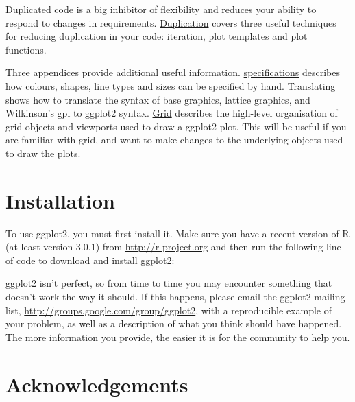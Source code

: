 Duplicated code is a big inhibitor of flexibility and reduces your
ability to respond to changes in requirements.
\hyperref[cha:duplication]{Duplication} covers three useful techniques
for reducing duplication in your code: iteration, plot templates and
plot functions.

Three appendices provide additional useful information.
\hyperref[cha:specifications]{specifications} describes how colours,
shapes, line types and sizes can be specified by hand.
\hyperref[cha:translating]{Translating} shows how to translate the
syntax of base graphics, lattice graphics, and Wilkinson's gpl to
ggplot2 syntax. \hyperref[cha:grid]{Grid} describes the high-level
organisation of grid objects and viewports used to draw a ggplot2 plot.
This will be useful if you are familiar with grid, and want to make
changes to the underlying objects used to draw the plots.

\section{Installation}\label{sec:installation}

To use ggplot2, you must first install it. Make sure you have a recent
version of R (at least version 3.0.1) from \url{http://r-project.org}
and then run the following line of code to download and install ggplot2:

\begin{Shaded}
\begin{Highlighting}[]
\NormalTok{(}\NormalTok{)}
\end{Highlighting}
\end{Shaded}

ggplot2 isn't perfect, so from time to time you may encounter something
that doesn't work the way it should. If this happens, please email the
ggplot2 mailing list, \url{http://groups.google.com/group/ggplot2}, with
a reproducible example of your problem, as well as a description of what
you think should have happened. The more information you provide, the
easier it is for the community to help you.

\section{Acknowledgements}\label{sec:acknolwedgements}


